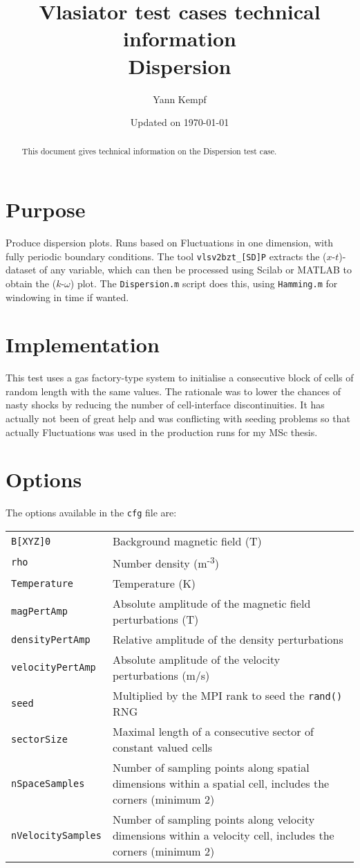\documentclass[a4paper,10pt]{scrartcl}
\title{
\Huge{Vlasiator test cases technical information} \\
\LARGE{Dispersion}
}
\author{Yann Kempf}
\date{Updated on \today}
\begin{document}
\maketitle

\begin{abstract}
   This document gives technical information on the Dispersion test case.
\end{abstract}

\section{Purpose}
Produce dispersion plots. Runs based on Fluctuations in one dimension, with fully periodic boundary conditions. The tool \verb=vlsv2bzt_[SD]P= extracts the ($x$-$t$)-dataset of any variable, which can then be processed using Scilab or MATLAB to obtain the ($k$-$\omega$) plot. The \verb=Dispersion.m= script does this, using \verb=Hamming.m= for windowing in time if wanted.


\section{Implementation}
This test uses a gas factory-type system to initialise a consecutive block of cells of random length with the same values. The rationale was to lower the chances of nasty shocks by reducing the number of cell-interface discontinuities. It has actually not been of great help and was conflicting with seeding problems so that actually Fluctuations was used in the production runs for my MSc thesis.

\section{Options}
The options available in the \verb=cfg= file are:

\begin{tabularx}{\textwidth}{lX}
   \verb=B[XYZ]0= & Background magnetic field (T) \\
   \verb=rho= & Number density (m\textsuperscript{-3}) \\
   \verb=Temperature= & Temperature (K) \\
   \verb=magPertAmp= & Absolute amplitude of the magnetic field perturbations (T) \\
   \verb=densityPertAmp= & Relative amplitude of the density perturbations \\
   \verb=velocityPertAmp= & Absolute amplitude of the velocity perturbations (m/s) \\
   \verb=seed= & Multiplied by the MPI rank to seed the \verb=rand()= RNG \\
   \verb=sectorSize= & Maximal length of a consecutive sector of constant valued cells \\
   \verb=nSpaceSamples= & Number of sampling points along spatial dimensions within a spatial cell, includes the corners (minimum 2) \\
   \verb=nVelocitySamples= & Number of sampling points along velocity dimensions within a velocity cell, includes the corners (minimum 2)
\end{tabularx}
\end{document}

